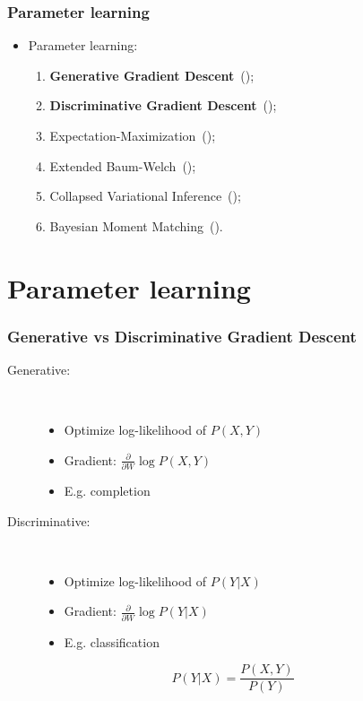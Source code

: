 \documentclass[usenames,dvipsnames]{beamer}
\newcommand{\ddspn}[2]{\frac{\partial#1}{\partial#2}}
\begin{document}
\begin{frame}
  \frametitle{Parameter learning}

  \begin{itemize}
    \item Parameter learning:
      \begin{enumerate}
        \item \textbf{Generative Gradient Descent}~(\cite{poon-domingos,diff-approach-darwiche});
        \item \textbf{Discriminative Gradient Descent}~(\cite{discriminative});
        \item Expectation-Maximization~(\cite{poon-domingos});
        \item Extended Baum-Welch~(\cite{baum-welch});
        \item Collapsed Variational Inference~(\cite{variational-spn});
        \item Bayesian Moment Matching~(\cite{bayesian-moment}).
      \end{enumerate}
  \end{itemize}
\end{frame}

\section{Parameter learning}

\begin{frame}
  \frametitle{Generative vs Discriminative Gradient Descent}

  \begin{description}
    \item[Generative:]~\\
      \begin{itemize}
        \item Optimize log-likelihood of $P(X,Y)$
        \item Gradient: $\ddspn{}{W}\log P(X,Y)$
        \item E.g. completion
      \end{itemize}
    \item[Discriminative:]~\\
      \begin{itemize}
        \item Optimize log-likelihood of $P(Y|X)$
        \item Gradient: $\ddspn{}{W}\log P(Y|X)$
        \item E.g. classification
      \end{itemize}
  \end{description}


  \begin{equation*}
    P(Y|X)=\frac{P(X,Y)}{P(Y)}
  \end{equation*}
\end{frame}
\end{document}
